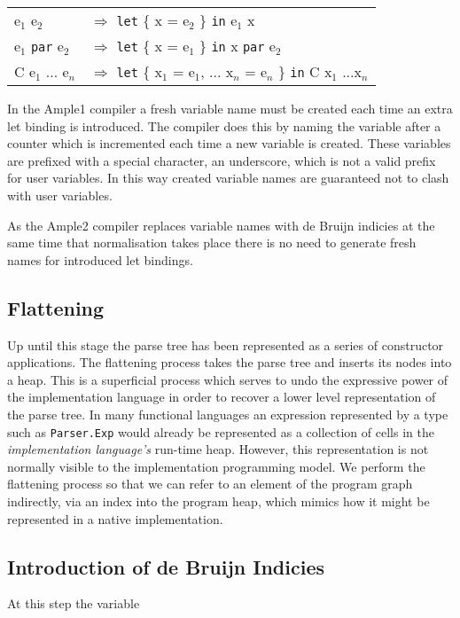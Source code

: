 \bigskip
\begin{tabular}{ll}
e$_1$ e$_2$ 	
	& $\Rightarrow$ 
	\texttt{let} \{ x = e$_2$ \} \texttt{in} e$_1$ x 
\\
e$_1$ \texttt{par} e$_2$
	& $\Rightarrow$ 
	\texttt{let} \{ x = e$_1$ \} \texttt{in} x \texttt{par} e$_2$ 
\\
C e$_1$ ... e$_n$ 		
	& $\Rightarrow$ 
	\texttt{let} \{ x$_1$ = e$_1$, ... x$_n$ = e$_n$ \} \texttt{in} C x$_1$ ...x$_n$ 
\\
\end{tabular}
\bigskip


In the Ample1 compiler a fresh variable name must be created each time an extra let binding is introduced. The compiler does this by naming the variable after a counter which is incremented each time a new variable is created. These variables are prefixed with a special character, an underscore, which is not a valid prefix for user variables. In this way created variable names are guaranteed not to clash with user variables.

As the Ample2 compiler replaces variable names with de Bruijn indicies at the same time that normalisation takes place there is no need to generate fresh names for introduced let bindings.


\subsection{Flattening}
Up until this stage the parse tree has been represented as a series of constructor applications. The flattening process takes the parse tree and inserts its nodes into a heap. This is a superficial process which serves to undo the expressive power of the implementation language in order to recover a lower level representation of the parse tree. In many functional languages an expression represented by a type such as \texttt{Parser.Exp} would already be represented as a collection of cells in the \emph{implementation language's} run-time heap. However, this representation is not normally visible to the implementation programming model. We perform the flattening process so that we can refer to an element of the program graph indirectly, via an index into the program heap, which mimics how it might be represented in a native implementation.


\subsection{Introduction of de Bruijn Indicies}
At this step the variable 



